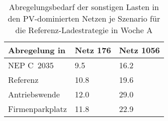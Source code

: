 {
\renewcommand{\arraystretch}{1.2}%
\begin{table}[H]
	\begin{center}
		\caption{Abregelungsbedarf der sonstigen Lasten in den PV-dominierten Netzen je Szenario für die Referenz-Ladestrategie in Woche A}
		\begin{tabu} to 0.6\textwidth {X[1.5] X[1, r] X[1, r]}
			\toprule
			Abregelung in   \si{\mwh}    & Netz \num{176} & Netz \num{1056} \\ \midrule
			NEP C~\num{2035}             & \num{9.5}      & \num{16.2}      \\
			Referenz                     & \num{10.8}     & \num{19.6}      \\
			Antriebswende                & \num{12.0}     & \num{29.0}      \\
			\glqq Firmenparkplatz\grqq{} & \num{11.8}     & \num{22.9}      \\ \bottomrule
		\end{tabu}
		\label{tab:pv_dominated_week_a_load_cur}
	\end{center}
	\vspace{-3mm}%
\end{table}
}